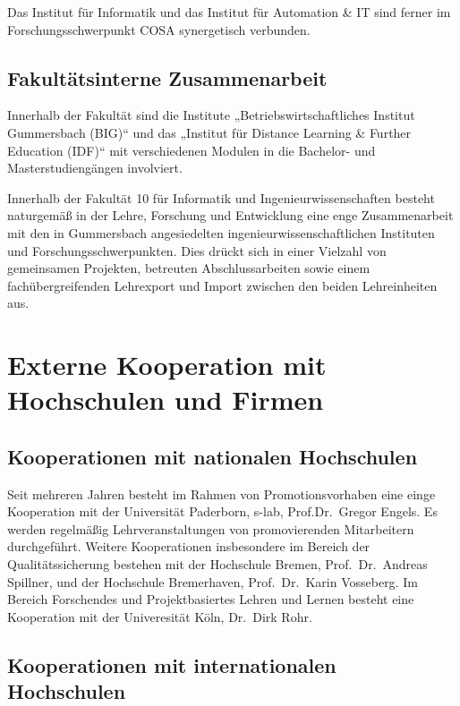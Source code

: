 Das Institut für Informatik und das Institut für Automation \& IT sind
ferner im Forschungsschwerpunkt COSA synergetisch verbunden.

\subsection{Fakultätsinterne
Zusammenarbeit}\label{fakultuxe4tsinterne-zusammenarbeit}

Innerhalb der Fakultät sind die Institute „Betriebswirtschaftliches
Institut Gummersbach (BIG)`` und das „Institut für Distance Learning \&
Further Education (IDF)`` mit verschiedenen Modulen in die Bachelor- und
Masterstudiengängen involviert.

Innerhalb der Fakultät 10 für Informatik und Ingenieurwissenschaften
besteht naturgemäß in der Lehre, Forschung und Entwicklung eine enge
Zusammenarbeit mit den in Gummersbach angesiedelten
ingenieurwissenschaftlichen Instituten und Forschungsschwerpunkten. Dies
drückt sich in einer Vielzahl von gemeinsamen Projekten, betreuten
Abschlussarbeiten sowie einem fachübergreifenden Lehrexport und Import
zwischen den beiden Lehreinheiten aus.

\section{Externe Kooperation mit Hochschulen und
Firmen}\label{externe-kooperation-mit-hochschulen-und-firmen}

\subsection{Kooperationen mit nationalen
Hochschulen}\label{kooperationen-mit-nationalen-hochschulen}

Seit mehreren Jahren besteht im Rahmen von Promotionsvorhaben eine einge
Kooperation mit der Universität Paderborn, s-lab, Prof.Dr.~Gregor
Engels. Es werden regelmäßig Lehrveranstaltungen von promovierenden
Mitarbeitern durchgeführt. Weitere Kooperationen insbesondere im Bereich
der Qualitätssicherung bestehen mit der Hochschule Bremen,
Prof.~Dr.~Andreas Spillner, und der Hochschule Bremerhaven,
Prof.~Dr.~Karin Vosseberg. Im Bereich Forschendes und Projektbasiertes
Lehren und Lernen besteht eine Kooperation mit der Univeresität Köln,
Dr.~Dirk Rohr.

\subsection{Kooperationen mit internationalen
Hochschulen}\label{kooperationen-mit-internationalen-hochschulen}

